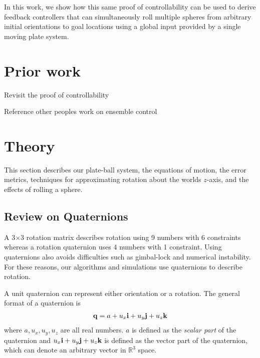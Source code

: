 \documentclass[letter paper, 10pt, conference]{ieeeconf}
\newcommand{\todo}[1]{\vspace{5 mm}\par \noindent \framebox{\begin{minipage}[c]{0.98 \columnwidth} \ttfamily\flushleft \textcolor{red}{#1}\end{minipage}}\vspace{5 mm}\par}
\providecommand{\field}[1]{\mathbb{#1}}
\providecommand{\R}{\field{R}}
\begin{document}
In this work, we show how this same proof of controllability can be used to derive feedback controllers that can simultaneously roll multiple spheres from arbitrary initial orientations to goal locations using a global input provided by a single moving plate system.


\section{Prior work}\label{sec:PriorWork}%


Revisit the proof of controllability
\todo{ insert proof}

Reference other peoples work on ensemble control


\section{Theory}\label{sec:theory}%

This section describes our plate-ball system, the equations of motion, the error metrics, techniques for approximating rotation about the worlds $z$-axis, and the effects of rolling a sphere.

\subsection{Review on Quaternions}

A 3$\times$3 rotation matrix describes rotation using 9 numbers with 6 constraints whereas a rotation quaternion uses 4 numbers with 1 constraint.  Using quaternions also avoids difficulties such as gimbal-lock and numerical instability. For these reasons, our algorithms and simulations use quaternions to describe rotation.


A unit quaternion can represent either orientation or a rotation.  The general format of a quaternion is
\begin{align}
{\bf q} = a+u_x{\bf i}+u_y{\bf j}+u_z{\bf k}\label{eq:Quaternion}
\end{align}
where $a,u_x,u_y,u_z$ are all real numbers.  $a$ is defined as the \emph{scalar part} of the quaternion and $u_x{\bf i}+u_y{\bf j}+u_z{\bf k}$ is defined as the vector part of the quaternion, which can denote an arbitrary vector in $\R^3$ space. 
\end{document}

